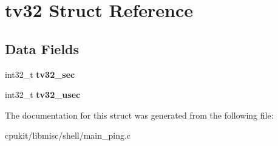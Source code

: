 \hypertarget{structtv32}{}\section{tv32 Struct Reference}
\label{structtv32}
\subsection*{Data Fields}
\begin{DoxyCompactItemize}
\item 
\mbox{\label{structtv32_a42d19e9066da36f0b143d13fd39c3668}} 
int32\+\_\+t {\bfseries tv32\+\_\+sec}
\item 
\mbox{\label{structtv32_a9541effdab886760c1c19b42c8be6b89}} 
int32\+\_\+t {\bfseries tv32\+\_\+usec}
\end{DoxyCompactItemize}


The documentation for this struct was generated from the following file\+:\begin{DoxyCompactItemize}
\item 
cpukit/libmisc/shell/main\+\_\+ping.\+c\end{DoxyCompactItemize}
